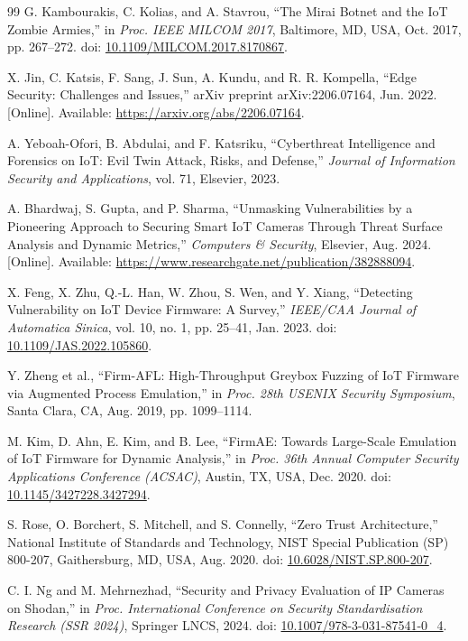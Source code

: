 \documentclass[letterpaper, 10pt, conference]{ieeeconf}
\begin{document}
\begin{thebibliography}{99}
G. Kambourakis, C. Kolias, and A. Stavrou,
``The Mirai Botnet and the IoT Zombie Armies,''
in \textit{Proc. IEEE MILCOM 2017},
Baltimore, MD, USA, Oct. 2017, pp. 267--272.
doi: \href{https://doi.org/10.1109/MILCOM.2017.8170867}{10.1109/MILCOM.2017.8170867}.

X. Jin, C. Katsis, F. Sang, J. Sun, A. Kundu, and R. R. Kompella,
``Edge Security: Challenges and Issues,''
arXiv preprint arXiv:2206.07164, Jun. 2022.
[Online]. Available: \url{https://arxiv.org/abs/2206.07164}.

A. Yeboah-Ofori, B. Abdulai, and F. Katsriku,
``Cyberthreat Intelligence and Forensics on IoT:
Evil Twin Attack, Risks, and Defense,''
\textit{Journal of Information Security and Applications},
vol. 71, Elsevier, 2023.

A. Bhardwaj, S. Gupta, and P. Sharma,
``Unmasking Vulnerabilities by a Pioneering Approach to
Securing Smart IoT Cameras Through Threat Surface Analysis
and Dynamic Metrics,''
\textit{Computers \& Security}, Elsevier, Aug. 2024.
[Online]. Available: \url{https://www.researchgate.net/publication/382888094}.

X. Feng, X. Zhu, Q.-L. Han, W. Zhou, S. Wen, and Y. Xiang,
``Detecting Vulnerability on IoT Device Firmware: A Survey,''
\textit{IEEE/CAA Journal of Automatica Sinica},
vol. 10, no. 1, pp. 25--41, Jan. 2023.
doi: \href{https://doi.org/10.1109/JAS.2022.105860}{10.1109/JAS.2022.105860}.

Y. Zheng et al.,
``Firm-AFL: High-Throughput Greybox Fuzzing of IoT Firmware
via Augmented Process Emulation,''
in \textit{Proc. 28th USENIX Security Symposium},
Santa Clara, CA, Aug. 2019, pp. 1099--1114.

M. Kim, D. Ahn, E. Kim, and B. Lee,
``FirmAE: Towards Large-Scale Emulation of IoT Firmware
for Dynamic Analysis,''
in \textit{Proc. 36th Annual Computer Security Applications
Conference (ACSAC)},
Austin, TX, USA, Dec. 2020.
doi: \href{https://doi.org/10.1145/3427228.3427294}{10.1145/3427228.3427294}.

S. Rose, O. Borchert, S. Mitchell, and S. Connelly,
``Zero Trust Architecture,''
National Institute of Standards and Technology,
NIST Special Publication (SP) 800-207,
Gaithersburg, MD, USA, Aug. 2020.
doi: \href{https://doi.org/10.6028/NIST.SP.800-207}{10.6028/NIST.SP.800-207}.

C. I. Ng and M. Mehrnezhad,
``Security and Privacy Evaluation of IP Cameras on Shodan,''
in \textit{Proc. International Conference on Security
Standardisation Research (SSR 2024)},
Springer LNCS, 2024.
doi: \href{https://doi.org/10.1007/978-3-031-87541-0_4}{10.1007/978-3-031-87541-0\_4}.


\end{thebibliography}
\end{document}
